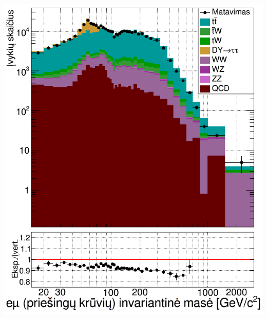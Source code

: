 \documentclass[xcolor=dvipsnames]{beamer}
\begin{document}
\begin{frame}
\begin{minipage}{0.44\textwidth}
		\includegraphics[width=\linewidth]{emuWQCD_SMALL.png}
	\end{minipage}
\end{frame}
\end{document}
